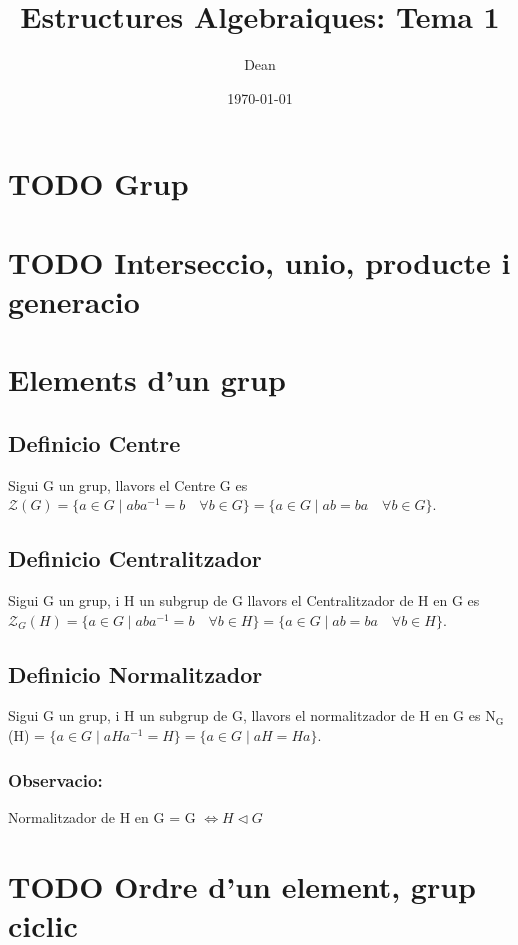 \documentclass[11pt]{article}
\author{Dean}
\date{\today}
\title{Estructures Algebraiques: Tema 1}
\begin{document}
\maketitle
\setcounter{tocdepth}{4}
\tableofcontents


\section{{\bfseries\sffamily TODO} Grup}
\label{sec:orgb5e1a65}
\section{{\bfseries\sffamily TODO} Interseccio, unio, producte i generacio}
\label{sec:org9a70c74}
\section{Elements d'un grup}
\label{sec:orgf1497ba}
\subsection{Definicio Centre}
\label{sec:org28ffbe0}
Sigui G un grup, llavors el Centre G es \(\mathcal{Z}(G) = \{ a \in G \mid aba^{-1} = b \quad \forall b \in G \} = \{ a \in G \mid ab = ba \quad \forall b \in G \}\).

\subsection{Definicio Centralitzador}
\label{sec:orgcf82755}
Sigui G un grup, i H un subgrup de G llavors el Centralitzador de H en G es \(\mathcal{Z}_{G}(H) = \{ a \in G \mid aba^{-1} = b \quad \forall b \in H \} = \{ a \in G \mid ab = ba \quad \forall b \in H \}\).

\subsection{Definicio Normalitzador}
\label{sec:org873eeff}
Sigui G un grup, i H un subgrup de G, llavors el normalitzador de H en G es N\(_{\text{G}}\)(H) = \(\{ a \in G \mid aHa^{-1} = H \} = \{ a \in G \mid aH = Ha \}\).

\subsubsection{Observacio:}
\label{sec:org4dc1c75}
Normalitzador de H en G = G \(\iff H \vartriangleleft G\)
\section{{\bfseries\sffamily TODO} Ordre d'un element, grup ciclic}
\label{sec:org46c3a92}
\end{document}
